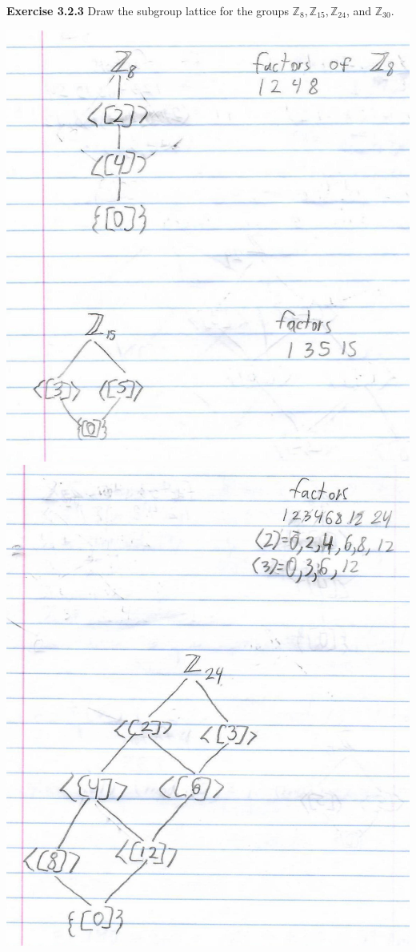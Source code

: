 \documentclass[a4paper]{article}
\begin{document}
\begin{myparindent}{0pt}
\textbf{Exercise 3.2.3}
Draw the subgroup lattice for the groups
$\mathbb{Z}_8, \mathbb{Z}_{15}, \mathbb{Z}_{24}$, and $\mathbb{Z}_{30}$.
\newline

\includegraphics{lattice-Z8-Z15}
\includegraphics{lattice-Z24}

\end{myparindent}
\end{document}
